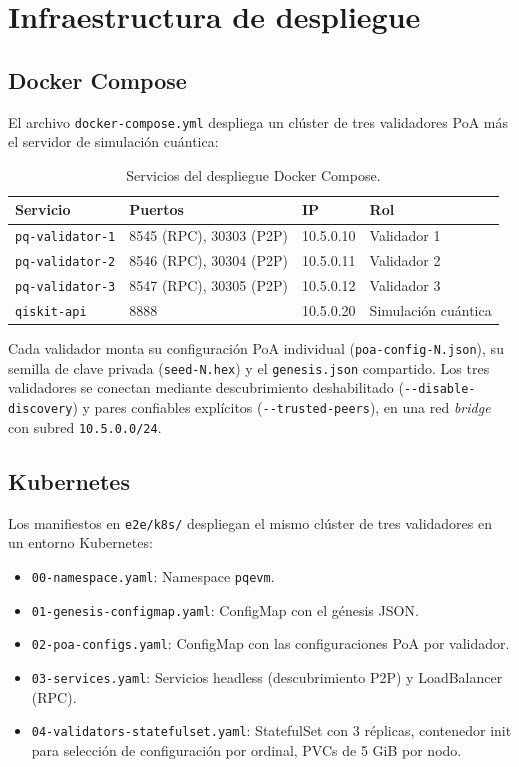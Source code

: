 \section{Infraestructura de despliegue}
\label{sec:dev_infra}

\subsection{Docker Compose}

El archivo \texttt{docker-compose.yml} despliega un clúster de tres validadores PoA más el servidor de simulación cuántica:

\begin{table}[htbp]
\centering
\caption{Servicios del despliegue Docker Compose.}
\label{tab:docker_services}
\begin{tabular}{@{}llll@{}}
\toprule
\textbf{Servicio} & \textbf{Puertos} & \textbf{IP} & \textbf{Rol} \\
\midrule
\texttt{pq-validator-1} & 8545 (RPC), 30303 (P2P) & 10.5.0.10 & Validador 1 \\
\texttt{pq-validator-2} & 8546 (RPC), 30304 (P2P) & 10.5.0.11 & Validador 2 \\
\texttt{pq-validator-3} & 8547 (RPC), 30305 (P2P) & 10.5.0.12 & Validador 3 \\
\texttt{qiskit-api} & 8888 & 10.5.0.20 & Simulación cuántica \\
\bottomrule
\end{tabular}
\end{table}

Cada validador monta su configuración PoA individual (\texttt{poa-config-N.json}), su semilla de clave privada (\texttt{seed-N.hex}) y el \texttt{genesis.json} compartido. Los tres validadores se conectan mediante descubrimiento deshabilitado (\texttt{-{}-disable-discovery}) y pares confiables explícitos (\texttt{-{}-trusted-peers}), en una red \emph{bridge} con subred \texttt{10.5.0.0/24}.

\subsection{Kubernetes}

Los manifiestos en \texttt{e2e/k8s/} despliegan el mismo clúster de tres validadores en un entorno Kubernetes:

\begin{itemize}
  \item \texttt{00-namespace.yaml}: Namespace \texttt{pqevm}.
  \item \texttt{01-genesis-configmap.yaml}: ConfigMap con el génesis JSON.
  \item \texttt{02-poa-configs.yaml}: ConfigMap con las configuraciones PoA por validador.
  \item \texttt{03-services.yaml}: Servicios headless (descubrimiento P2P) y LoadBalancer (RPC).
  \item \texttt{04-validators-statefulset.yaml}: StatefulSet con 3 réplicas, contenedor init para selección de configuración por ordinal, PVCs de 5 GiB por nodo.
\end{itemize}

